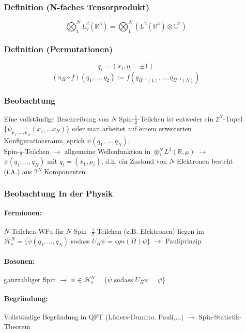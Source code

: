 \documentclass[twoside,a4paper]{scrartcl}
\newcommand{\R}{\mathbb{R}}
\renewcommand{\1}{\mathds{1}}
\newcommand{\ra}{\rightarrow}
\renewcommand{\R}{\mathbb{R}}
\begin{document}
\subsubsection*{Definition (N-faches Tensorprodukt)}
$$\bigotimes_1^N L^2_q(\mathbb R^3)= \bigotimes_1^N(L^2(\mathbb R^3)\otimes \mathbb C^2)$$
\subsubsection*{Definition (Permutationen)}
$$q_i=(x_i,\mu=\pm 1)$$
$$(u_\Pi \circ f)(q_1,...,q_2):=f(q_{\Pi^{-1}(1)},...,q_{\Pi^{-1}(N)}) $$
\subsubsection*{Beobachtung}
Eine vollständige Beschreibung von $N$ Spin-$\frac{1}{2}$-Teilchen ist entweder ein $2^N$-Tupel $\{\psi_{\mu_1,...,\mu_N}(x_1,...x_N)\}$ oder man arbeitet auf einem erweiterten Konfigurationsraum, sprich $\psi(q_1,...,q_N)$.\\
Spin-$\frac{1}{2}$-Teilchen $\ra$ allgemeine Wellenfunktion in $\otimes_1^N L^2(\R,\mu)$ $\ra$ $\psi(q_1,...,q_N)$ mit $q_i=(x_1,\mu_i)$, d.h. ein Zustand von $N$ Elektronen besteht (i.A.) aus $2^N$ Komponenten.
\subsubsection*{Beobachtung In der Physik}
\paragraph{Fermionen:} $N$-Teilchen-WFu für $N$ Spin -$\frac{1}{2}$-Teilchen (z.B. Elektronen) liegen im $\mathcal H_a^N=\{\psi(q_1,...,q_N)$ sodass $U_\Pi \psi=sgn(\Pi)\psi\}$ $\ra$ Pauliprinzip
\paragraph{Bosonen:} ganzzahliger Spin $\ra$ $\psi \in \mathcal H_s^N=\{\psi$ sodass $U_\Pi \psi=\psi\}$ 
\paragraph{Begründung:}
Vollständige Begründung in QFT (Lüders-Dumino, Pauli,...) $\ra$ Spin-Statistik-Theorem
\end{document}
